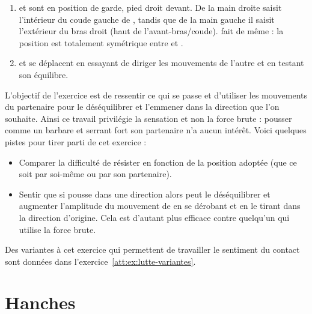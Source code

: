 \begin{exercice}
	\label{struc:ex:lutte}



	\begin{enumerate}
		\item \A et \D sont en position de garde, pied droit devant.
		De la main droite \A saisit l'intérieur du coude gauche de \D, tandis que de la main gauche il saisit l'extérieur du bras droit (haut de l'avant-bras/coude).
		\D fait de même : la position est totalement symétrique entre \A et \D.
		
		\item \A et \D se déplacent en essayant de diriger les mouvements de l'autre et en testant son équilibre.
	\end{enumerate}

	L'objectif de l'exercice est de ressentir ce qui se passe et d'utiliser les mouvements du partenaire pour le déséquilibrer et l'emmener dans la direction que l'on souhaite.
	Ainsi ce travail privilégie la sensation et non la force brute : pousser comme un barbare et serrant fort son partenaire n'a aucun intérêt.
	Voici quelques pistes pour tirer parti de cet exercice :
	\begin{itemize}
		\item Comparer la difficulté de résister en fonction de la position adoptée (que ce soit par soi-même ou par son partenaire).
		
		\item Sentir que si \A pousse dans une direction alors \D peut le déséquilibrer et augmenter l'amplitude du mouvement de \A en se dérobant et en le tirant dans la direction d'origine.
		Cela est d'autant plus efficace contre quelqu'un qui utilise la force brute.
	\end{itemize}

	Des variantes à cet exercice qui permettent de travailler le sentiment du contact sont données dans l'exercice~\ref{att:ex:lutte-variantes}.

\end{exercice}


\section{Hanches}


